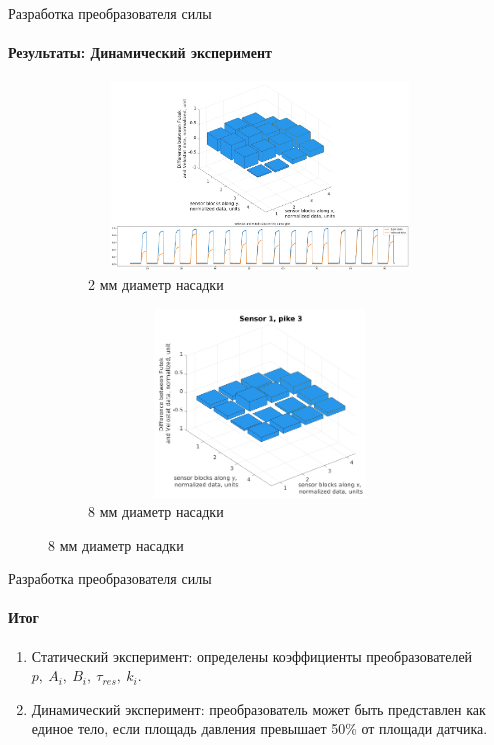 \documentclass[aspectratio=169,xcolor=table]{beamer}
\begin{document}
\begin{frame}[t]{Разработка преобразователя силы}
    \framesubtitle{Результаты: Динамический эксперимент}
    \vspace{-15pt}
    \begin{figure}[H]
        \begin{subfigure}{0.64\textwidth}
            \centering\includegraphics[height=5cm,width=1\textwidth,keepaspectratio]{sens1_pike1_mod.png}
            \caption*{2 мм диаметр насадки}
            \label{fig:sens1_pike1}
        \end{subfigure}
        \begin{subfigure}{0.34\textwidth}
            \centering\includegraphics[height=5cm,width=1\textwidth,keepaspectratio]{sens1_pike3.png}
            \caption*{8 мм диаметр насадки}
            \label{fig:sens1_pike3}
        \end{subfigure}
    \end{figure}
\end{frame}

\begin{frame}[t]{Разработка преобразователя силы}
    \framesubtitle{Итог}
    \vspace{-15pt}
    {\large
    \begin{enumerate}
        \item Статический эксперимент: определены коэффициенты преобразователей $p,\ A_i,\ B_i,\ \tau_{res},\ k_i$.
        \item Динамический эксперимент: преобразователь может быть представлен как единое тело, если площадь давления превышает 50\% от площади датчика.
    \end{enumerate}
    }
\end{frame}
\end{document}
